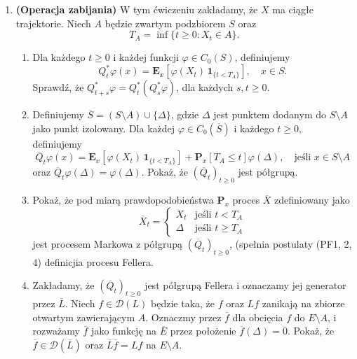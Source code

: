 \documentclass{article}
\begin{document}
\begin{enumerate}
	\item \textbf{(Operacja zabijania)} 
		W tym ćwiczeniu zakładamy, że \( X \) ma ciągłe trajektorie. 
		Niech \( A \) będzie zwartym podzbiorem \( S \) oraz
		\[
			T_A = \inf \{ t \geq 0 : X_t \in A \}.
		\]
	\begin{enumerate}
		\item Dla każdego \( t \geq 0 \) i każdej 
			funkcji \( \varphi \in C_0(S) \), definiujemy
    			\[
    				Q_t^* \varphi(x) = 
				\mathbf{E}_x [\varphi(X_t) \, \mathbf{1}_{\{t < T_A\}}] , \quad x \in S.
    			\] 
    			Sprawdź, że \( Q_{t+s}^* \varphi = Q_t^*(Q_s^* \varphi) \), 
			dla każdych \( s, t \geq 0 \).
    		\item Definiujemy \( \overline{S} = (S \setminus A) \cup \{\Delta\} \), 
			gdzie \( \Delta \) jest punktem dodanym do \( S \setminus A \) 
			jako punkt izolowany.
    			Dla każdej \( \varphi \in C_0(\overline{S}) \) i 
			każdego \( t \geq 0 \), definiujemy
    			\[
    				\overline{Q}_t \varphi(x) 
				= \mathbf{E}_x [\varphi(X_t) \, \mathbf{1}_{\{t < T_A\}}] + 
				\mathbf{P}_x[T_A \leq t] \varphi(\Delta) , 
				\quad \text{jeśli } x \in S\setminus A
    			\]
    			oraz \( \overline{Q}_t \varphi(\Delta) = \varphi(\Delta) \). 
			Pokaż, że \( (\overline{Q}_t)_{t \geq 0} \) jest półgrupą.
    		\item Pokaż, że pod miarą prawdopodobieństwa \( \mathbf{P}_x \) 
			proces \( \overline{X} \) zdefiniowany jako
    \[
    \overline{X}_t = 
    \begin{cases} 
      X_t & \text{jeśli } t < T_A \\ 
      \Delta & \text{jeśli } t \geq T_A 
    \end{cases}
    \]
    jest procesem Markowa z półgrupą \( (\overline{Q}_t)_{t \geq 0} \), 
    (spełnia postulaty (PF1, 2, 4) definicjia procesu Fellera.
    
    \item Zakładamy, że \( (\overline{Q}_t)_{t \geq 0} \) jest półgrupą Fellera i 
	    oznaczamy jej generator przez \( \overline{L} \). 
	    Niech \( f \in \mathcal{D}(L) \) będzie taka, że $f$ oraz 
	    \( Lf \) zanikają na zbiorze otwartym zawierającym \( A \). 
	    Oznaczmy przez \( \overline{f} \) dla obcięcia \( f \) do \( E \setminus A \), 
	    i rozważamy \( \overline{f} \) jako funkcję na \( \overline{E} \) przez 
	    położenie \( \overline{f}(\Delta) = 0 \). 
	    Pokaż, że \( \overline{f} \in \mathcal{D}(\overline{L}) \) 
	    oraz \( \overline{L} \overline{f} = Lf \) na \( E \setminus A \).
\end{enumerate}


\end{enumerate}
\end{document}

